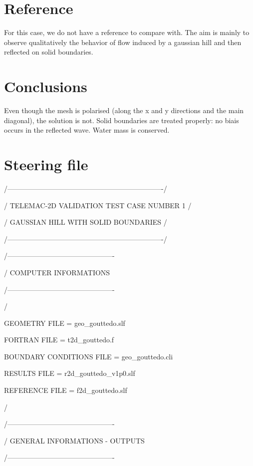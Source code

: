 \section{Reference}
For this case, we do not have a reference to compare with. The aim is mainly to observe qualitatively the behavior of flow induced by a gaussian hill and then reflected on solid boundaries. 

\section{ Conclusions}

 Even though the mesh is polarised (along the x and y directions and the main diagonal), the solution is not.
 Solid boundaries are treated properly: no biais occurs in the reflected wave.
 Water mass is conserved.

\section{ Steering file}

 /-------------------------------------------------------------------/

 /   TELEMAC-2D       VALIDATION TEST CASE NUMBER 1                  /

 /                  GAUSSIAN HILL WITH SOLID BOUNDARIES              /

 /-------------------------------------------------------------------/

 /----------------------------------------------

 / COMPUTER INFORMATIONS

 /----------------------------------------------

 /

 GEOMETRY FILE                   = geo\_gouttedo.slf

 FORTRAN FILE                    = t2d\_gouttedo.f

 BOUNDARY CONDITIONS FILE        = geo\_gouttedo.cli

 RESULTS FILE                    = r2d\_gouttedo\_v1p0.slf

 REFERENCE FILE                  = f2d\_gouttedo.slf

 /

 /----------------------------------------------

 / GENERAL INFORMATIONS - OUTPUTS

 /----------------------------------------------

